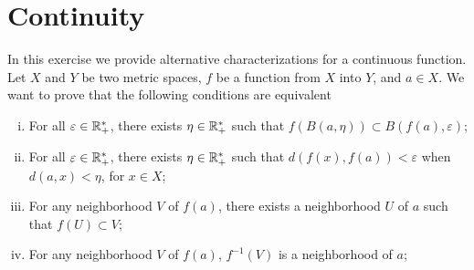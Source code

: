\section{Continuity}
In this exercise we provide alternative characterizations for a continuous function.
Let $X$ and $Y$ be two metric spaces, $f$ be a function from $X$ into $Y$, and \(a\in X\).
We want to prove that the following conditions are equivalent
\begin{enumerate}[(i)]
	\item For all \(\varepsilon\in\mathbb{R}_+^*\), there exists \(\eta\in\mathbb{R}_+^*\) such that \(f(B(a,\eta))\subset B(f(a),\varepsilon)\);
    \item For all \(\varepsilon\in\mathbb{R}_+^*\), there exists \(\eta\in\mathbb{R}_+^*\) such that \(d(f(x),f(a))<\varepsilon\) when \(d(a,x)<\eta\), for \(x\in X\);
    \item For any neighborhood $V$ of \(f(a)\), there exists a neighborhood $U$ of $a$ such that \(f(U)\subset V\);
    \item For any neighborhood $V$ of \(f(a)\), \(f^{-1}(V)\) is a neighborhood of $a$;
\end{enumerate}
